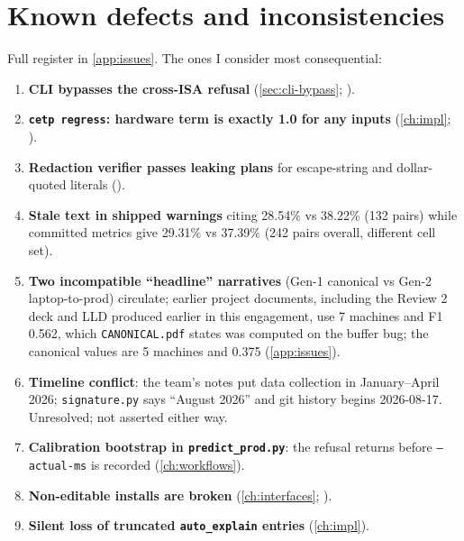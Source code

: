 \section{Known defects and inconsistencies}
Full register in \cref{app:issues}. The ones I consider most consequential:
\begin{enumerate}
\item \textbf{CLI bypasses the cross-ISA refusal} (\cref{sec:cli-bypass}; \evRUN).
\item \textbf{\texttt{cetp regress}: hardware term is exactly 1.0 for any inputs} (\cref{ch:impl}; \evRUN).
\item \textbf{Redaction verifier passes leaking plans} for escape-string and dollar-quoted literals (\evRUN).
\item \textbf{Stale text in shipped warnings} citing 28.54\% vs 38.22\% (132 pairs) while committed metrics give 29.31\% vs 37.39\% (242 pairs overall, different cell set).
\item \textbf{Two incompatible ``headline'' narratives} (Gen-1 canonical vs Gen-2 laptop-to-prod) circulate; earlier project documents, including the Review 2 deck and LLD produced earlier in this engagement, use 7 machines and F1 0.562, which \texttt{CANONICAL.pdf} states was computed on the buffer bug; the canonical values are 5 machines and 0.375 (\cref{app:issues}).
\item \textbf{Timeline conflict}: the team's notes put data collection in January--April 2026; \texttt{signature.py} says ``August 2026'' and git history begins 2026-08-17. Unresolved; not asserted either way.
\item \textbf{Calibration bootstrap in \texttt{predict\_prod.py}}: the refusal returns before \texttt{--actual-ms} is recorded (\cref{ch:workflows}).
\item \textbf{Non-editable installs are broken} (\cref{ch:interfaces}; \evRUN).
\item \textbf{Silent loss of truncated \texttt{auto\_explain} entries} (\cref{ch:impl}).
\end{enumerate}

